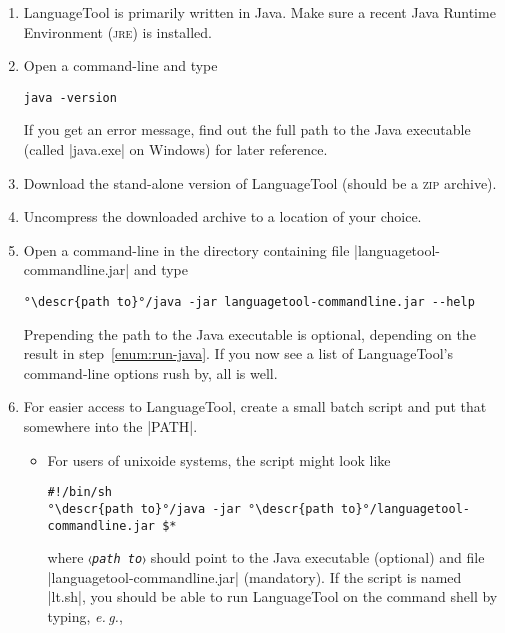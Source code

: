 \documentclass[11pt]{article}
\newcommand*{\acr}[1]{\mbox{\scshape#1}}
\newcommand*{\descr}[1]{〈\emph{#1}〉}
\newcommand*{\latinphrase}[1]{\foreignlanguage{latin}{\emph{#1}}}
\newcommand*{\lpeg}{\latinphrase{e.\,g.}\xspace}
\begin{document}
\begin{enumerate}

\item LanguageTool is primarily written in Java.  Make sure a recent
  Java Runtime Environment (\acr{jre}) is installed.

\item\label{enum:run-java} Open a command-line and type

\begin{lstlisting}
java -version
\end{lstlisting}
%
  If you get an error message, find out the full path to the Java
  executable (called |java.exe| on Windows) for later reference.

\item Download the stand-alone version of LanguageTool (should be a
  \acr{zip} archive).

\item Uncompress the downloaded archive to a location of your choice.

\item Open a command-line in the directory containing file
  |languagetool-commandline.jar| and type

\begin{lstlisting}[escapeinside=°°]
°\descr{path to}°/java -jar languagetool-commandline.jar --help
\end{lstlisting}
%
  Prepending the path to the Java executable is optional, depending on
  the result in step~\ref{enum:run-java}.  If you now see a list of
  LanguageTool's command-line options rush by, all is well.

\item For easier access to LanguageTool, create a small batch script and
  put that somewhere into the |PATH|.

  \begin{itemize}

  \item For users of unixoide systems, the script might look like

\begin{lstlisting}[escapeinside=°°]
#!/bin/sh
°\descr{path to}°/java -jar °\descr{path to}°/languagetool-commandline.jar $*
\end{lstlisting}
%
    where \texttt{\descr{path to}} should point to the Java executable
    (optional) and file |languagetool-commandline.jar| (mandatory).  If
    the script is named |lt.sh|, you should be able to run LanguageTool
    on the command shell by typing, \lpeg,


\end{itemize}
\end{enumerate}
\end{document}
